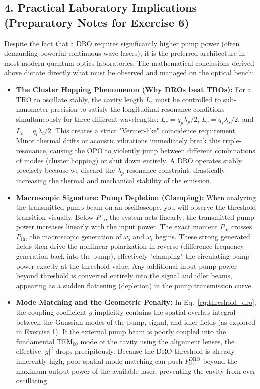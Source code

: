\begin{resolucao}[Solution]
    \subsection*{4. Practical Laboratory Implications (Preparatory Notes for Exercise 6)}

    Despite the fact that a DRO requires significantly higher pump power (often demanding powerful continuous-wave lasers), it is the preferred architecture in most modern quantum optics laboratories. The mathematical conclusions derived above dictate directly what must be observed and managed on the optical bench:

    \begin{itemize}
        \item \textbf{The Cluster Hopping Phenomenon (Why DROs beat TROs):} 
        For a TRO to oscillate stably, the cavity length $L_c$ must be controlled to sub-nanometer precision to satisfy the longitudinal resonance conditions simultaneously for three different wavelengths: $L_c = q_p \lambda_p / 2$, $L_c = q_s \lambda_s / 2$, and $L_c = q_i \lambda_i / 2$. This creates a strict "Vernier-like" coincidence requirement. Minor thermal drifts or acoustic vibrations immediately break this triple-resonance, causing the OPO to violently jump between different combinations of modes (cluster hopping) or shut down entirely. A DRO operates stably precisely because we discard the $\lambda_p$ resonance constraint, drastically increasing the thermal and mechanical stability of the emission.

        \item \textbf{Macroscopic Signature: Pump Depletion (Clamping):} 
        When analyzing the transmitted pump beam on an oscilloscope, you will observe the threshold transition visually. Below $P_{\mathrm{th}}$, the system acts linearly; the transmitted pump power increases linearly with the input power. The exact moment $P_{\mathrm{in}}$ crosses $P_{\mathrm{th}}$, the macroscopic generation of $\omega_s$ and $\omega_i$ begins. These strong generated fields then drive the nonlinear polarization in reverse (difference-frequency generation back into the pump), effectively "clamping" the circulating pump power exactly at the threshold value. Any additional input pump power beyond threshold is converted entirely into the signal and idler beams, appearing as a sudden flattening (depletion) in the pump transmission curve.

        \item \textbf{Mode Matching and the Geometric Penalty:} 
        In Eq.~\eqref{eq:threshold_dro}, the coupling coefficient $g$ implicitly contains the spatial overlap integral between the Gaussian modes of the pump, signal, and idler fields (as explored in Exercise 1). If the external pump beam is poorly coupled into the fundamental TEM$_{00}$ mode of the cavity using the alignment lenses, the effective $|g|^2$ drops precipitously. Because the DRO threshold is already inherently high, poor spatial mode matching can push $P_{\mathrm{th}}^{\mathrm{DRO}}$ beyond the maximum output power of the available laser, preventing the cavity from ever oscillating.
    \end{itemize}

\end{resolucao}